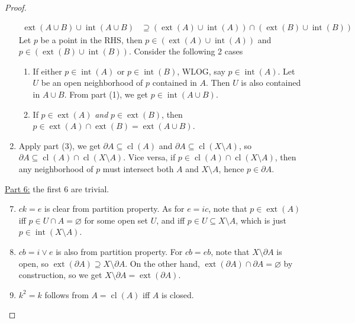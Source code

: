 \documentclass{treatise}
\begin{document}
\begin{proof}
\begin{enumerate}
    \begin{align*}
        \operatorname{ext} \left( A \cup B \right) \cup \operatorname{int} \left( A \cup B \right) & \supseteq (\operatorname{ext}(A) \cup \operatorname{int}(A)) \cap (\operatorname{ext}(B) \cup \operatorname{int}(B))
    \end{align*}
    Let $p$ be a point in the RHS, then $p \in (\operatorname{ext}(A) \cup \operatorname{int}(A))$ and $p \in (\operatorname{ext}(B) \cup \operatorname{int}(B))$. Consider the following 2 cases
    \begin{enumerate}
        \item If either $p \in \operatorname{int}(A)$ or $p \in \operatorname{int}(B)$, WLOG, say $p \in \operatorname{int}(A)$. Let $U$ be an open neighborhood of $p$ contained in $A$. Then $U$ is also contained in $A \cup B$. From part (1), we get $p \in \operatorname{int} \left( A \cup B \right)$.
        \item If $p \in \operatorname{ext}(A)$ \textit{and} $p \in \operatorname{ext}(B)$, then $p \in \operatorname{ext}(A) \cap \operatorname{ext}(B) = \operatorname{ext}(A \cup B)$.
    \end{enumerate}
    \item Apply part (3), we get $\partial A \subseteq \operatorname{cl}(A)$ and $\partial A \subseteq \operatorname{cl}(X \setminus A)$, so $\partial A \subseteq \operatorname{cl}(A) \cap \operatorname{cl}(X \setminus A)$. Vice versa, if $p \in \operatorname{cl}(A) \cap \operatorname{cl}(X \setminus A)$, then any neighborhood of $p$ must intersect both $A$ and $X \setminus A$, hence $p \in \partial A$.
\end{enumerate}
\underline{Part 6:} the first 6 are trivial.
\begin{enumerate}[label=(\alph*)] \setcounter{enumi}{6}
    \item $ck = e$ is clear from partition property. As for $e = ic$, note that $p \in \operatorname{ext}(A)$ iff $p \in U \cap A = \varnothing$ for some open set $U$, and iff $p \in U \subseteq X \setminus A$, which is just $p \in \operatorname{int}(X \setminus A)$.
    \item $cb = i \vee e$ is also from partition property. For $cb = eb$, note that $X \setminus \partial A$ is open, so $\operatorname{ext}(\partial A) \supseteq X \setminus \partial A$. On the other hand, $\operatorname{ext}(\partial A) \cap \partial A = \varnothing$ by construction, so we get $X \setminus \partial A = \operatorname{ext}(\partial A)$.
    \item $k^2 = k$ follows from $A = \operatorname{cl}(A)$ iff $A$ is closed.

\end{enumerate}
\end{proof}
\end{document}
